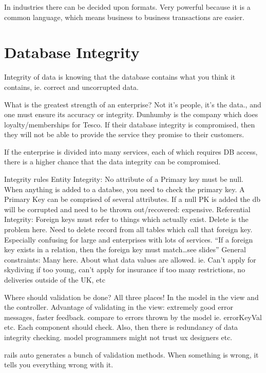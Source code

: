 \documentclass[11pt]{article}
\begin{document}
In industries there can be decided upon formats. Very powerful because it is a common language, which means business to business transactions are easier.



\section{Database Integrity}

Integrity of data is knowing that the database contains what you think it contains, ie. correct and uncorrupted data.

What is the greatest strength of an enterprise? Not it’s people, it’s the data., and one must ensure its accuracy or integrity. Dunhumby is the company which does loyalty/memberships for Tesco. If their database integrity is compromised, then they will not be able to provide the service they promise to their customers.

If the enterprise is divided into many services, each of which requires DB access, there is a higher chance that the data integrity can be compromised.

Integrity rules
Entity Integrity: No attribute of a Primary key must be null. When anything is added to a databse, you need to check the primary key. A Primary Key can be comprised of several attributes. If a null PK is added the db will be corrupted and need to be thrown out/recovered: expensive.
Referential Integrity: Foreign keys must refer to things which actually exist. Delete is the problem here. Need to delete record from all tables which call that foreign key. Especially confusing for large and enterprises with lots of services. “If a foreign key exists in a relation, then the foreign key must match…see slides”
General constraints: Many here. About what data values are allowed. ie. Can’t apply for skydiving if too young, can’t apply for insurance if too many restrictions, no deliveries outside of the UK, etc

Where should validation be done?
All three places! In the model in the view and the controller. Advantage of validating in the view: extremely good error messages, faster feedback. compare to errors thrown by the model ie. errorKeyVal etc. Each component should check. Also, then there is redundancy of data integrity checking. model programmers might not trust ux designers etc.

rails auto generates a bunch of validation methods. When something is wrong, it tells you everything wrong with it.
\end{document}
